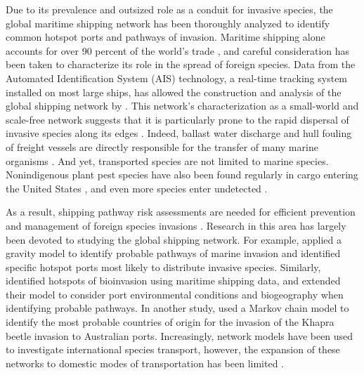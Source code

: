 \documentclass[12pt]{article}
\begin{document}
Due to its prevalence and outsized role as a conduit for invasive species, the global maritime shipping network has been thoroughly analyzed to identify common hotspot ports and pathways of invasion.  Maritime shipping alone accounts for over 90 percent of the world's trade  \citep{Kaluza2009}, and careful consideration has been taken to characterize its role in the spread of foreign species.  Data from the Automated Identification System (AIS) technology, a real-time tracking system installed on most large ships, has allowed the construction and analysis of the global shipping network by  \citep{Kaluza2009}.  This network's characterization as a small-world and scale-free network suggests that it is particularly prone to the rapid dispersal of invasive species along its edges \citep{Pastor2001}.  Indeed, ballast water discharge and hull fouling of freight vessels are directly responsible for the transfer of many marine organisms \citep{Ruiz2000}.  And yet, transported species are not limited to marine species. Nonindigenous plant pest species have also been found regularly in cargo entering the United States \citep{McCullough2006, Work2005}, and even more species enter undetected \citep{Work2005}.

As a result, shipping pathway risk assessments are needed for efficient prevention and management of foreign species invasions \citep{Hulme2009}.  Research in this area has largely been devoted to studying the global shipping network.  For example, \citet{Drake2004} applied a gravity model to identify probable pathways of marine invasion and identified specific hotspot ports most likely to distribute invasive species.   Similarly, \citet{Seebens2013} identified hotspots of bioinvasion using maritime shipping data, and extended their model to consider port environmental conditions and biogeography when identifying probable pathways.  In another study, \citet{Paini2012} used a Markov chain model to identify the most probable countries of origin for the invasion of the Khapra beetle invasion to Australian ports.  Increasingly, network models have been used to investigate international species transport, however, the expansion of these networks to domestic modes of transportation has been limited \citep{Hulme2009}.
\end{document}
